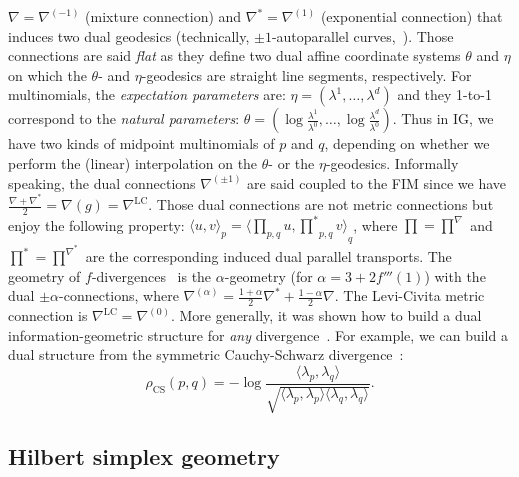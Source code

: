 \documentclass[graybox]{svmult}
\def\CS{\mathrm{CS}}
\def\LC{\mathrm{LC}}
\def\Finner#1#2#3{{\langle {#1},{#2} \rangle}_{#3}}
\def\inner#1#2{ \langle {#1},{#2} \rangle }
\begin{document}
$\nabla=\nabla^{(-1)}$ (mixture connection) and $\nabla^*=\nabla^{(1)}$ (exponential connection) that induces two dual geodesics (technically, $\pm 1$-autoparallel curves,~\cite{IG-2014}). Those connections are said {\em flat} as they define two dual affine coordinate systems $\theta$ and $\eta$ on which the
$\theta$- and $\eta$-geodesics are straight line segments, respectively. 
For multinomials, the {\em expectation parameters} are:
$\eta = (\lambda^1,\ldots,\lambda^d)$
and they 1-to-1 correspond to the {\em natural parameters}:
$\theta = \left(\log\frac{\lambda^1}{\lambda^0},\ldots,\log\frac{\lambda^d}{\lambda^0}\right)$.
Thus in IG, we have two kinds of midpoint multinomials of $p$ and $q$, depending on whether we perform the (linear) interpolation on the $\theta$- or the $\eta$-geodesics.
Informally speaking, the dual connections $\nabla^{(\pm 1)}$ are said coupled to the FIM since we have  
$\frac{\nabla+\nabla^*}{2}=\nabla(g)=\nabla^{\LC}$. Those dual connections are not metric connections but enjoy the following property:
$\Finner{u}{v}{p} = \Finner{{\prod}_{p,q} u}{{\prod^*}_{p,q} v}{q}$, where $\prod=\prod^{\nabla}$ and ${\prod^*}={\prod^{\nabla^*}}$ are the corresponding induced dual parallel transports.
The geometry of $f$-divergences~\cite{DivIG-2010} is the $\alpha$-geometry (for $\alpha=3+2f'''(1)$) with the dual $\pm\alpha$-connections, where $\nabla^{(\alpha)}=\frac{1+\alpha}{2}\nabla^*+\frac{1-\alpha}{2}\nabla$. The Levi-Civita metric connection is $\nabla^\LC=\nabla^{(0)}$.
More generally, it was shown how to build a dual information-geometric structure for {\em any} divergence~\cite{DivIG-2010}.
For example, we can build a dual structure from the symmetric Cauchy-Schwarz divergence~\cite{CS-2006}:
\begin{equation}
\rho_\CS(p,q)=- \log \frac{\inner{\lambda_p}{\lambda_q}}{\sqrt{\inner{\lambda_p}{\lambda_p}\inner{\lambda_q}{\lambda_q}}}.
\end{equation}

\subsection{Hilbert simplex geometry}
\end{document}
